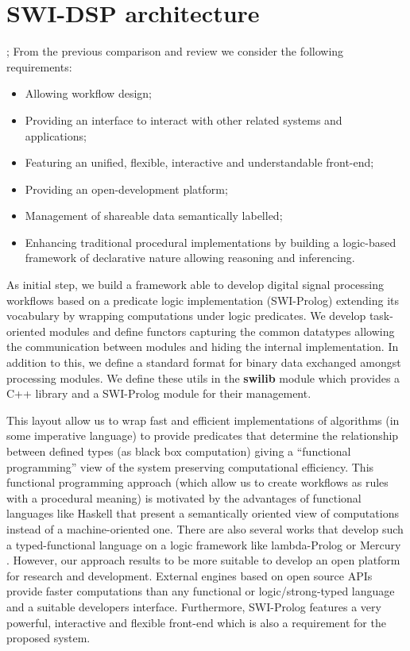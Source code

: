 \documentclass[runningheads]{llncs}
\begin{document}
\section{SWI-DSP architecture}\label{sec:architecture}
;
From the previous comparison and review we consider the following requirements:

\begin{itemize}
 \item Allowing workflow design;
 \item Providing an interface to interact with other related systems and applications;
 \item Featuring an unified, flexible, interactive and understandable front-end;
 \item Providing an open-development platform;
 \item Management of shareable data semantically labelled;
 \item Enhancing traditional procedural implementations by building a logic-based framework of declarative nature allowing reasoning and inferencing.
\end{itemize}

As initial step, we build a framework able to develop digital signal processing workflows based on a predicate logic implementation (SWI-Prolog) extending its vocabulary by wrapping computations under logic predicates. We develop task-oriented modules and define functors capturing the common datatypes allowing the communication between modules and hiding the internal implementation. In addition to this, we define a standard format for binary data exchanged amongst processing modules. We define these utils in the \textbf{swilib} module which provides a C++ library and a SWI-Prolog module for their management.

This layout allow us to wrap fast and efficient implementations of algorithms (in some imperative language) to provide predicates that determine the relationship between defined types (as black box computation) giving a ``functional programming'' view of the system preserving computational efficiency. This functional programming approach (which allow us to create workflows as rules with a procedural meaning) is motivated by the advantages of functional languages like Haskell \cite{haskell} that present a semantically oriented view of computations instead of a machine-oriented one. There are also several works that develop such a typed-functional language on a logic framework like lambda-Prolog or Mercury \cite{mercury}. However, our approach results to be more suitable to develop an open platform for research and development. External engines based on open source APIs provide faster computations than any functional or logic/strong-typed language and a suitable developers interface. Furthermore, SWI-Prolog features a very powerful, interactive and flexible front-end which is also a requirement for the proposed system.
\end{document}
